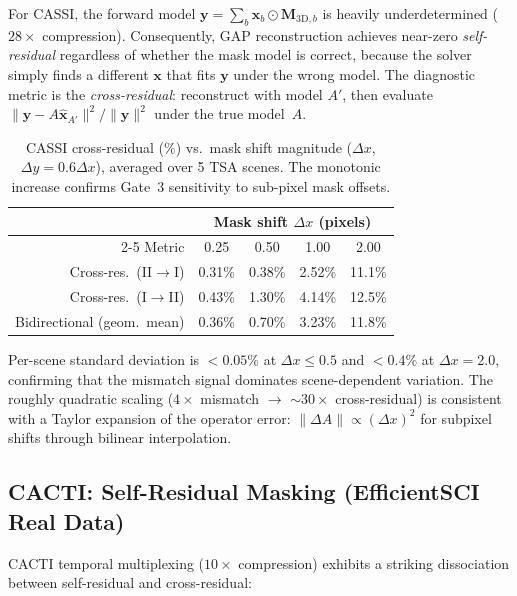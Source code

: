 \documentclass[11pt]{article}
\begin{document}
For CASSI, the forward model $\mathbf{y} = \sum_b \mathbf{x}_b \odot \mathbf{M}_{3\mathrm{D},b}$ is heavily underdetermined ($28\times$ compression).
Consequently, GAP reconstruction achieves near-zero \emph{self-residual} regardless of whether the mask model is correct, because the solver simply finds a different $\mathbf{x}$ that fits $\mathbf{y}$ under the wrong model.
The diagnostic metric is the \emph{cross-residual}: reconstruct with model $A'$, then evaluate $\|\mathbf{y} - A\hat{\mathbf{x}}_{A'}\|^2 / \|\mathbf{y}\|^2$ under the true model~$A$.

\begin{table}[!ht]
\centering\small
\caption{CASSI cross-residual (\%) vs.\ mask shift magnitude ($\Delta x$, $\Delta y = 0.6\Delta x$), averaged over 5 TSA scenes.
The monotonic increase confirms Gate~3 sensitivity to sub-pixel mask offsets.}
\label{tab:cassi_cross_res}
\begin{tabular}{@{}rcccc@{}}
\toprule
& \multicolumn{4}{c}{Mask shift $\Delta x$ (pixels)} \\
\cmidrule(l){2-5}
Metric & 0.25 & 0.50 & 1.00 & 2.00 \\
\midrule
Cross-res.\ (II$\to$I)  & 0.31\% & 0.38\% & 2.52\% & 11.1\% \\
Cross-res.\ (I$\to$II)  & 0.43\% & 1.30\% & 4.14\% & 12.5\% \\
Bidirectional (geom.\ mean)  & 0.36\% & 0.70\% & 3.23\% & 11.8\% \\
\bottomrule
\end{tabular}
\end{table}

\noindent Per-scene standard deviation is $< 0.05\%$ at $\Delta x \leq 0.5$ and $< 0.4\%$ at $\Delta x = 2.0$, confirming that the mismatch signal dominates scene-dependent variation.
The roughly quadratic scaling ($4\times$ mismatch $\to$ ${\sim}30\times$ cross-residual) is consistent with a Taylor expansion of the operator error: $\|\Delta A\| \propto (\Delta x)^2$ for subpixel shifts through bilinear interpolation.

\subsection{CACTI: Self-Residual Masking (EfficientSCI Real Data)}
\label{sec:cacti_cross}

CACTI temporal multiplexing ($10\times$ compression) exhibits a striking dissociation between self-residual and cross-residual:
\end{document}
